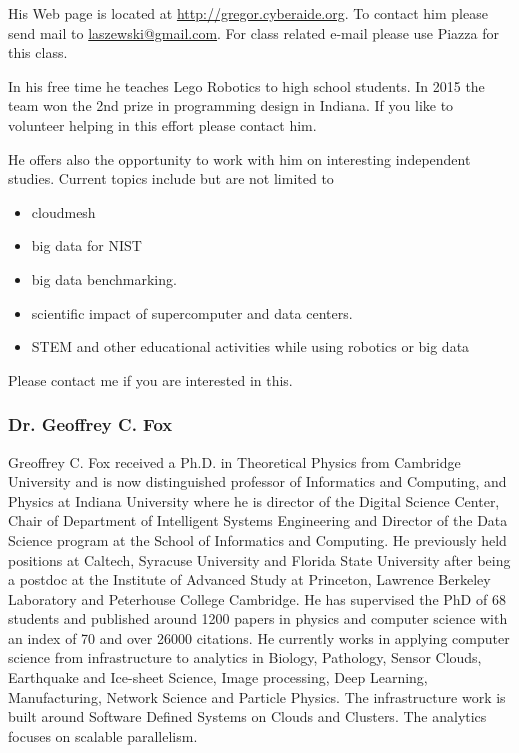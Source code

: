 His Web page is located at \url{http://gregor.cyberaide.org}. To contact him
please send mail to \href{mailto:laszewski@gmail.com}{laszewski@gmail.com}. For class related e-mail
please use Piazza for this class.

In his free time he teaches Lego Robotics to high school students. In 2015
the team won the 2nd prize in programming design in Indiana. If you like
to volunteer helping in this effort please contact him.

He offers also the opportunity to work with him on interesting
independent studies. Current topics include but are not limited to
\begin{itemize}
\item {} 
cloudmesh

\item {} 
big data for NIST

\item {} 
big data benchmarking.

\item {} 
scientific impact of supercomputer and data centers.

\item {} 
STEM and other educational activities while using robotics or big data

\end{itemize}

Please contact me if you are interested in this.


\subsubsection{Dr. Geoffrey C. Fox}
\label{\detokenize{i524/preface/instructors:dr-geoffrey-c-fox}}
\noindent{}

Greoffrey C. Fox received a Ph.D. in Theoretical Physics from Cambridge University
and is now distinguished professor of Informatics and Computing, and
Physics at Indiana University where he is director of the Digital
Science Center, Chair of Department of Intelligent Systems Engineering
and Director of the Data Science program at the School of Informatics
and Computing.  He previously held positions at Caltech, Syracuse
University and Florida State University after being a postdoc at the
Institute of Advanced Study at Princeton, Lawrence Berkeley Laboratory
and Peterhouse College Cambridge. He has supervised the PhD of 68
students and published around 1200 papers in physics and computer
science with an index of 70 and over 26000 citations.  He currently
works in applying computer science from infrastructure to analytics in
Biology, Pathology, Sensor Clouds, Earthquake and Ice-sheet Science,
Image processing, Deep Learning, Manufacturing, Network Science and
Particle Physics. The infrastructure work is built around Software
Defined Systems on Clouds and Clusters. The analytics focuses on
scalable parallelism.

